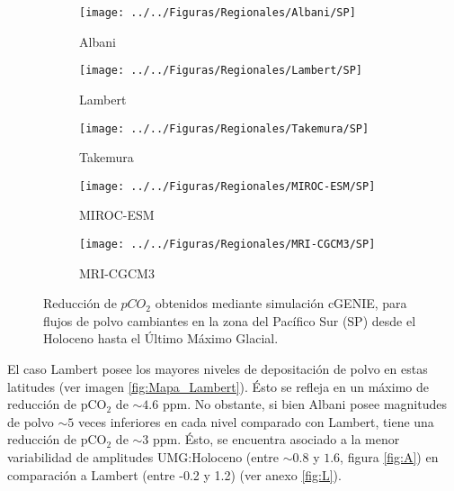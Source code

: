  \begin{figure}[H]
        \begin{subfigure}[b]{0.5\textwidth}
                \texttt{[image: ../../Figuras/Regionales/Albani/SP]}
                \caption{Albani}
                \label{fig:L_R_SP}
        \end{subfigure}%
        \begin{subfigure}[b]{0.5\textwidth}
                \texttt{[image: ../../Figuras/Regionales/Lambert/SP]}
                \caption{Lambert}
                \label{fig:A_R_SP}
        \end{subfigure}%
        
        \begin{subfigure}[b]{0.5\textwidth}
                \texttt{[image: ../../Figuras/Regionales/Takemura/SP]}
                \caption{Takemura}
                \label{fig:T_R_SP}
        \end{subfigure}%
        \begin{subfigure}[b]{0.5\textwidth}
                \texttt{[image: ../../Figuras/Regionales/MIROC-ESM/SP]}
                \caption{MIROC-ESM}
                \label{fig:MI_R_SP}
        \end{subfigure}
        
        \begin{subfigure}[b]{0.5\textwidth}
                \texttt{[image: ../../Figuras/Regionales/MRI-CGCM3/SP]}
                \caption{MRI-CGCM3}
                \label{fig:MR_R_SP}
        \end{subfigure}
        \caption[Series de reducci\'on de $pCO_2$ de flujos regionales de polvo (SP)]{Reducci\'on de $pCO_2$ obtenidos mediante simulaci\'on cGENIE, para flujos de polvo cambiantes en la zona del Pacífico Sur (SP) desde el Holoceno hasta el \'Ultimo M\'aximo Glacial.}\label{fig:SP}
\end{figure}

El caso Lambert posee los mayores niveles de depositación de polvo en estas latitudes (ver imagen \ref{fig:Mapa_Lambert}). Ésto se refleja en un máximo de reducción de pCO$_2$ de $\sim 4.6$ ppm. No obstante, si bien Albani posee magnitudes de polvo $\sim 5$ veces inferiores en cada nivel comparado con Lambert, tiene una reducción de pCO$_2$ de $\sim 3$ ppm. Ésto, se encuentra asociado a la menor variabilidad de amplitudes UMG:Holoceno (entre $\sim 0.8$ y $1.6$, figura \ref{fig:A}) en comparación a Lambert (entre -0.2 y 1.2) (ver anexo \ref{fig:L}). 

